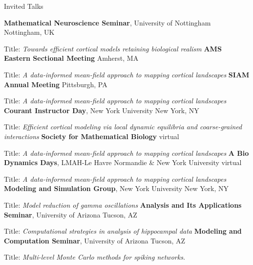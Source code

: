 \begin{rubric}{Invited Talks}

\entry*[2022.10]%
	\textbf{Mathematical Neuroscience Seminar}, University of Nottingham \hfill Nottingham, UK
	\par Title: \textit{Towards efficient cortical models retaining biological realism}
\entry*[2022.10]%
	\textbf{AMS Eastern Sectional Meeting} \hfill Amherst, MA
    \par Title: \textit{A data-informed mean-field approach to mapping cortical landscapes}
\entry*[2022.07]%
    \textbf{SIAM Annual Meeting} \hfill Pittsburgh, PA
    \par Title: \textit{A data-informed mean-field approach to mapping cortical landscapes}
\entry*[2022.02]%
    \textbf{Courant Instructor Day}, New York University \hfill New York, NY
    \par Title: \textit{Efficient cortical modeling via local dynamic equilibria and coarse-grained interactions}
\entry*[2021.06]%
    \textbf{Society for Mathematical Biology} \hfill virtual
    \par Title: \textit{A data-informed mean-field approach to mapping cortical landscapes}
\entry*[2021.06]%
    \textbf{A Bio Dynamics Days}, LMAH-Le Havre Normandie \& New York University \hfill virtual
    \par Title: \textit{A data-informed mean-field approach to mapping cortical landscapes}
\entry*[2021.04]%
    \textbf{Modeling and Simulation Group}, New York University \hfill New York, NY
    \par Title: \textit{Model reduction of gamma oscillations}
\entry*[2019.03]%
    \textbf{Analysis and Its Applications Seminar}, University of Arizona \hfill Tucson, AZ
    \par Title: \textit{Computational strategies in analysis of hippocampal data}  
\entry*[2018.02]%
    \textbf{Modeling and Computation Seminar}, University of Arizona \hfill Tucson, AZ
    \par Title: \textit{Multi-level Monte Carlo methods for spiking networks.}      
\end{rubric}